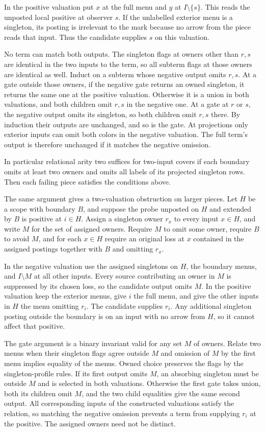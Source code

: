 In the positive valuation put $x$ at
the full menu and $y$ at $I\setminus\{s\}$.
This reads the unposted local positive
at observer $s$. If the unlabelled
exterior menu is a singleton, its
posting is irrelevant to the mark
because no arrow from the piece reads
that input. Thus the candidate supplies
$s$ on this valuation.

No term can match both outputs. The
singleton flags at owners other than
$r,s$ are identical in the two inputs
to the term, so all subterm flags at
those owners are identical as well.
Induct on a subterm whose negative
output omits $r,s$. At a gate outside
those owners, if the negative gate
returns an owned singleton, it returns
the same one at the positive valuation.
Otherwise it is a union in both
valuations, and both children omit
$r,s$ in the negative one. At a gate
at $r$ or $s$, the negative output
omits its singleton, so both children
omit $r,s$ there. By induction their
outputs are unchanged, and so is the
gate. At projections only exterior
inputs can omit both colors in the
negative valuation. The full term's
output is therefore unchanged if it
matches the negative omission.

In particular relational arity two
suffices for two-input covers if each
boundary omits at least two owners
and omits all labels of its projected
singleton rows. Then each failing
piece satisfies the conditions above.

The same argument gives a two-valuation
obstruction on larger pieces. Let $H$ be a
scope with boundary $B$, and suppose the
probe unposted on $H$ and extended by $B$
is positive at $i\in H$. Assign a singleton
owner $r_x$ to every input $x\in H$, and
write $M$ for the set of assigned owners.
Require $M$ to omit some owner, require
$B$ to avoid $M$, and for each $x\in H$
require an original loss at $x$ contained
in the assigned postings together with
$B$ and omitting $r_x$.

In the negative valuation use the assigned
singletons on $H$, the boundary menus, and
$I\setminus M$ at all other inputs. Every
source contributing an owner in $M$ is
suppressed by its chosen loss, so the
candidate output omits $M$. In the positive
valuation keep the exterior menus, give $i$
the full menu, and give the other inputs in
$H$ the menu omitting $r_i$. The candidate
supplies $r_i$. Any additional singleton
posting outside the boundary is on an
input with no arrow from $H$, so it cannot
affect that positive.

The gate argument is a binary invariant valid
for any set $M$ of owners. Relate two menus
when their singleton flags agree outside $M$
and omission of $M$ by the first menu implies
equality of the menus. Owned choice preserves
the flags by the singleton-profile rules.
If its first output omits $M$, an absorbing
singleton must be outside $M$ and is selected
in both valuations. Otherwise the first gate
takes union, both its children omit $M$, and
the two child equalities give the same second
output. All corresponding inputs of the
constructed valuations satisfy the relation,
so matching the negative omission prevents
a term from supplying $r_i$ at the positive.
The assigned owners need not be distinct.

